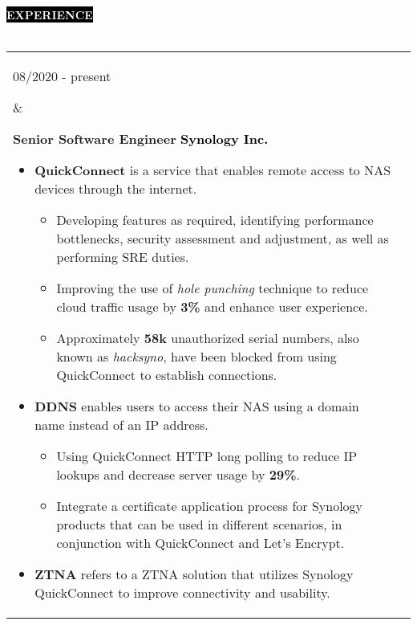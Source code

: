 \documentclass[10pt,A4]{article}
\makeatletter
\newcounter{a}
\newcounter{b}
\newcounter{c}
\newcommand{\cvsection}[1] {
	\textcolor{white}{\MakeUppercase{\textbf{#1}}}
}
\newcommand{\cvsect}[1]{
	\colorbox{black}{{\cvsection{#1}}}\\\\%
}
\newenvironment{entrylist}{%
	\begin{tabular*}{\textwidth}[t]{@{\extracolsep{\fill}}ll}
	}{%
	\end{tabular*}
}
\newcommand{\entry}[4]{%
	\parbox[t]{3.5cm}{%
		#1%
	}%
	&\parbox[t]{14cm}{%
		\textbf{#2}%
		\hfill%
		{\footnotesize \textbf{\textcolor{black}{#3}}}\\%
		#4%
	}\\\\}
\makeatother
\begin{document}
	\cvsect{Experience}\nobreak
	\begin{entrylist}
		\entry
		{08/2020 - present}
		{Senior Software Engineer}
		{Synology Inc.}
		{
				\begin{itemize}[leftmargin=*]
					\vspace{-0.5\baselineskip}
					\item \textbf{QuickConnect} \small is a service that enables remote access to NAS devices through the internet.\\
					\begin{itemize}\normalsize
						\vspace{-1\baselineskip}
						\item Developing features as required, identifying performance bottlenecks, security assessment and adjustment, as well as performing SRE duties.
						\item Improving the use of \textit{hole punching} technique to reduce cloud traffic usage by \textbf{3\%} and enhance user experience.
						\item Approximately \textbf{58k} unauthorized serial numbers, also known as \textit{hacksyno}, have been blocked from using QuickConnect to establish connections.
					\end{itemize}
					\item \textbf{DDNS} \small enables users to access their NAS using a domain name instead of an IP address.\\
					\begin{itemize}\normalsize
						\vspace{-1\baselineskip}
						\item Using QuickConnect HTTP long polling to reduce IP lookups and decrease server usage by \textbf{29\%}.
						\item Integrate a certificate application process for Synology products that can be used in different scenarios, in conjunction with QuickConnect and Let's Encrypt.
					\end{itemize}
					\item \textbf{ZTNA} \small refers to a ZTNA solution that utilizes Synology QuickConnect to improve connectivity and usability.\\
					\begin{itemize}\normalsize
						\vspace{-1\baselineskip}

\end{itemize}
\end{itemize}}
\end{entrylist}
\end{document}
